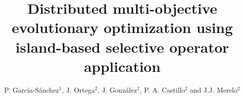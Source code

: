 \documentclass[preprint]{elsarticle}
\begin{document}
\begin{frontmatter}

\title{Distributed multi-objective evolutionary optimization using island-based selective operator application}


\author{P. Garc\'ia-S\'anchez$^1$, J. Ortega$^2$, J. Gonz\'alez$^2$, P. A. Castillo$^2$ and J.J. Merelo$^2$}
\address{
$^1$ Department of Computer Science and Engineering. ESI. University of C\'adiz, Spain\\
$^2$ Department of Computer Architecture and Computer Technology.\\ ETSIIT - CITIC. University of Granada, Spain\\
}


\begin{abstract}


\end{abstract}
\end{frontmatter}
\end{document}
